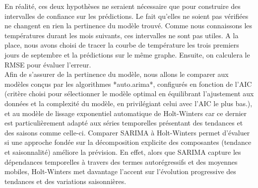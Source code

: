 \documentclass{article}
\theoremstyle{definition}
\theoremstyle{remark}
\begin{document}
En réalité, ces deux hypothèses ne seraient nécessaire que pour construire des intervalles de confiance sur les prédictions. Le fait qu'elles ne soient pas vérifiées ne changent en rien la pertinence du modèle trouvé. Comme nous connaissons les températures durant les mois suivants, ces intervalles ne sont pas utiles. A la place, nous avons choisi de tracer la courbe de température les trois premiers jours de septembre et la prédictions sur le même graphe. Ensuite, on calculera le RMSE pour évaluer l'erreur.\newline
\newline
\\
Afin de s'assurer de la pertinence du modèle, nous allons le comparer aux modèles conçus par les algorithmes *auto.arima*, configurés en fonction de l'AIC (critère choisi pour sélectionner le modèle optimal en équilibrant l'ajustement aux données et la complexité du modèle, en privilégiant celui avec l'AIC le plus bas.), et au modèle de lissage exponentiel automatique de Holt-Winters car ce dernier est particulièrement adapté aux séries temporelles présentant des tendances et des saisons comme celle-ci. Comparer SARIMA à Holt-Winters permet d’évaluer si une approche fondée sur la décomposition explicite des composantes (tendance et saisonnalité) améliore la prévision. En effet, alors que SARIMA capture les dépendances temporelles à travers des termes autorégressifs et des moyennes mobiles, Holt-Winters met davantage l’accent sur l’évolution progressive des tendances et des variations saisonnières.
\end{document}

